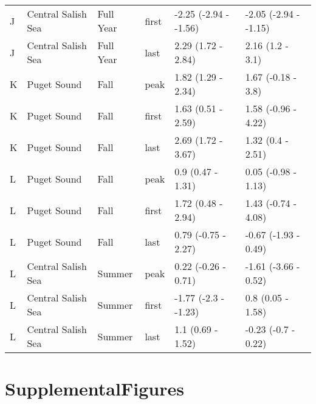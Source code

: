 \documentclass{article}
\begin{document}
\begin{table}[ht]
\begin{tabular}{|p{}|p{}|p{}|p{}|p{}|p{}|}
  J & Central Salish Sea & Full Year & first & -2.25 (-2.94 - -1.56) & -2.05 (-2.94 - -1.15) \\ 
  J & Central Salish Sea & Full Year & last & 2.29 (1.72 - 2.84) & 2.16 (1.2 - 3.1) \\ 
   \hline
K & Puget Sound & Fall & peak & 1.82 (1.29 - 2.34) & 1.67 (-0.18 - 3.8) \\ 
  K & Puget Sound & Fall & first & 1.63 (0.51 - 2.59) & 1.58 (-0.96 - 4.22) \\ 
  K & Puget Sound & Fall & last & 2.69 (1.72 - 3.67) & 1.32 (0.4 - 2.51) \\ 
   \hline
L & Puget Sound & Fall & peak & 0.9 (0.47 - 1.31) & 0.05 (-0.98 - 1.13) \\ 
  L & Puget Sound & Fall & first & 1.72 (0.48 - 2.94) & 1.43 (-0.74 - 4.08) \\ 
  L & Puget Sound & Fall & last & 0.79 (-0.75 - 2.27) & -0.67 (-1.93 - 0.49) \\ 
   \hline
L & Central Salish Sea & Summer & peak & 0.22 (-0.26 - 0.71) & -1.61 (-3.66 - 0.52) \\ 
  L & Central Salish Sea & Summer & first & -1.77 (-2.3 - -1.23) & 0.8 (0.05 - 1.58) \\ 
  L & Central Salish Sea & Summer & last & 1.1 (0.69 - 1.52) & -0.23 (-0.7 - 0.22) \\ 
   \hline
\end{tabular}
\endgroup
\end{table}\section* {SupplementalFigures}

  
\end{document}
